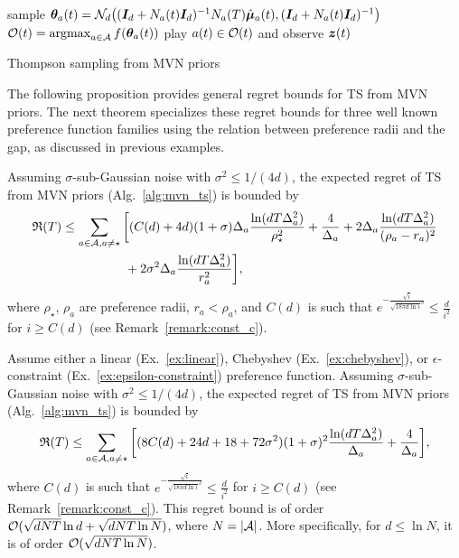 \begin{algorithm}[t]
    \begin{algorithmic}[1]
                \STATE sample $\boldsymbol{\theta}_a(t) = \mathcal{N}_d \big( (\boldsymbol{I}_d + N_a(t) \boldsymbol{I}_d)^{-1} N_a(T) \hat {\boldsymbol{\mu}}_a(t), (\boldsymbol{I}_d + N_a(t) \boldsymbol{I}_d)^{-1} \big)$
            \ENDFOR
            \STATE $\mathcal{O}(t) = \operatorname*{argmax}_{a \in \mathcal{A}} f(\boldsymbol{\theta}_a(t))$
            \STATE play $a(t) \in \mathcal{O}(t)$ and observe $\boldsymbol{z}(t)$
        \ENDFOR
    \end{algorithmic}
    \caption{Thompson sampling from MVN priors}
\label{alg:mvn_ts}
\end{algorithm}

The following proposition provides general regret bounds for TS from MVN priors. The next theorem specializes these regret bounds for three well known preference function families using the relation between preference radii and the gap, as discussed in previous examples.

\begin{proposition}
\label{prop:mvn_ts}
    Assuming $\sigma$-sub-Gaussian noise with $\sigma^2 \leq 1/(4d)$, the expected regret of TS from MVN priors (Alg.~\ref{alg:mvn_ts}) is bounded by
    \begin{align*}
        \mathfrak{R}(T)
        & \leq \sum_{a \in \mathcal{A}, a \neq \star} \bigg[
        (C(d) + 4d) (1 + \sigma) \Delta_a \frac{\ln(d T \Delta_a^2)}{\rho_\star^2} + \frac{4}{\Delta_a}
        + 2 \Delta_a \frac{\ln(d T \Delta_a^2)}{(\rho_a - r_a)^2} \\
        & \qquad \qquad \quad + 2 \sigma^2 \Delta_a \frac{\ln(d T \Delta_a^2)}{r_a^2} \bigg],
    \end{align*}
    where $\rho_\star$, $\rho_a$ are preference radii, $r_a < \rho_a$, and $C(d)$ is such that $e^{-\frac{\sqrt{i}}{\sqrt{18 \pi d \ln i}^d}}\leq \frac{d}{i^2}$ for $i \geq C(d)$ (see Remark~\ref{remark:const_c}).
\end{proposition}

\begin{theorem}
\label{thm:mvn_ts}
    Assume either a linear (Ex.~\ref{ex:linear}), Chebyshev (Ex.~\ref{ex:chebyshev}), or $\epsilon$-constraint (Ex.~\ref{ex:epsilon-constraint}) preference function. Assuming $\sigma$-sub-Gaussian noise with $\sigma^2 \leq 1/(4d)$, the expected regret of TS from MVN priors (Alg.~\ref{alg:mvn_ts}) is bounded by
    \begin{align*}
        \mathfrak{R}(T) \leq \sum_{a \in \mathcal{A}, a \neq \star} \bigg[
        (8C(d) + 24d + 18 + 72\sigma^2) (1 + \sigma)^2 \frac{\ln(d T \Delta_a^2)}{\Delta_a} + \frac{4}{\Delta_a} \bigg],
    \end{align*}
    where $C(d)$ is such that $e^{-\frac{\sqrt{i}}{\sqrt{18 \pi d \ln i}^d}} \leq \frac{d}{i^2}$ for $i \geq C(d)$ (see Remark~\ref{remark:const_c}). This regret bound is of order $\mathcal{O}(\sqrt{dNT}\ln d + \sqrt{dNT \ln N})$, where $N = |\mathcal{A}|$. More specifically, for $d \leq \ln N$, it is of order $\mathcal{O}(\sqrt{dNT \ln N})$.
\end{theorem}

